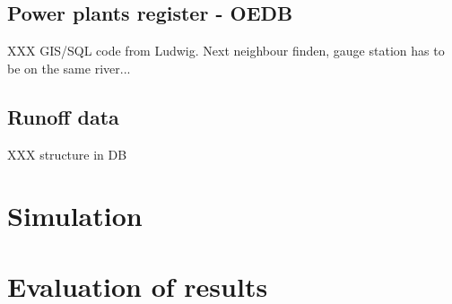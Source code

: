 \subsection{Power plants register - OEDB}
XXX GIS/SQL code from Ludwig. Next neighbour finden, gauge station has to be on the same river...
\subsection{Runoff data}
XXX structure in DB

\section{Simulation}

\section{Evaluation of results}

